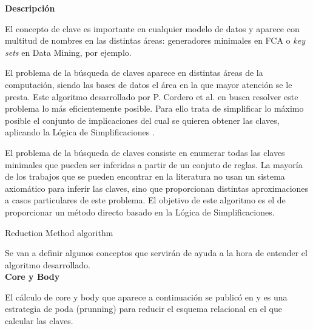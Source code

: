 \textbf{Descripci\'on} 

El concepto de clave es importante en cualquier modelo de datos y aparece con multitud de nombres en las distintas \'areas: generadores minimales en FCA o \textit{key sets} en Data Mining, por ejemplo.

El problema de la b\'usqueda de claves aparece en distintas \'areas de la computaci\'on, siendo las bases de datos el \'area en la que mayor atenci\'on se le presta. Este algoritmo desarrollado por P. Cordero et al. en  \cite{Reduction} busca resolver este problema lo m\'as eficientemente posible. Para ello trata de simplificar lo m\'aximo posible el conjunto de implicaciones del cual se quieren obtener las claves, aplicando la L\'ogica de Simplificaciones \cite{Cordero2002}.

El problema de la b\'usqueda de claves consiste en enumerar todas las claves minimales que pueden ser inferidas a partir de un conjuto de reglas. La mayor\'ia de los trabajos que se pueden encontrar en la literatura no usan un sistema axiom\'atico para inferir las claves, sino que proporcionan distintas aproximaciones a casos particulares de este problema. El objetivo de este algoritmo es el de proporcionar un m\'etodo directo basado en la L\'ogica de Simplificaciones.\\

\IncMargin{1em}
\begin{algorithm}[H]
    \SetAlgoLined
    \DontPrintSemicolon
    \caption{Reduction Method algorithm}\label{alg:3}
\end{algorithm}\DecMargin{1em}
\newpage
Se van a definir algunos conceptos que servir\'an de ayuda a la hora de entender el algoritmo desarrollado.\\

\textbf{Core y Body}

El c\'alculo de core y body que aparece a continuaci\'on se public\'o en \cite{Reduction} y es una estrategia de poda (prunning) para reducir el esquema relacional en el que calcular las claves. 

